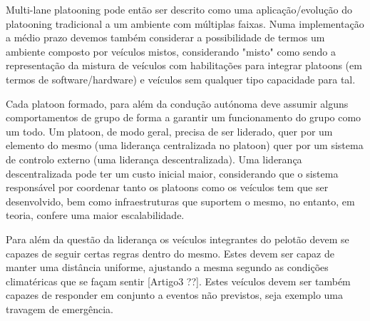 Multi-lane platooning pode então ser descrito como uma aplicação/evolução do platooning tradicional a um ambiente com múltiplas faixas. Numa implementação a médio prazo devemos também considerar a possibilidade de termos um ambiente composto por veículos mistos, considerando "misto" como sendo a representação da mistura de veículos com habilitações para integrar platoons (em termos de software/hardware) e veículos sem qualquer tipo capacidade para tal.

Cada platoon formado, para além da condução autónoma deve assumir alguns comportamentos de grupo de forma a garantir um funcionamento do grupo como um todo. Um platoon, de modo geral, precisa de ser liderado, quer por um elemento do mesmo (uma liderança centralizada no platoon) quer por um sistema de controlo externo (uma liderança descentralizada). Uma liderança descentralizada pode ter um custo inicial maior, considerando que o sistema responsável por coordenar tanto os platoons como os veículos tem que ser desenvolvido, bem como infraestruturas que suportem o mesmo, no entanto, em teoria, confere uma maior escalabilidade.

Para além da questão da liderança os veículos integrantes do pelotão devem se capazes de seguir certas regras dentro do mesmo. Estes devem ser capaz de manter uma distância uniforme, ajustando a mesma segundo as condições climatéricas que se façam sentir [Artigo3 ??]. Estes veículos devem ser também capazes de responder em conjunto a eventos não previstos, seja exemplo uma travagem de emergência.

